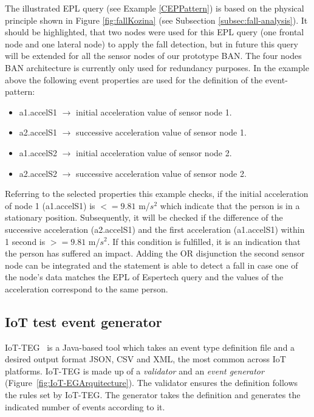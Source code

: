 \documentclass[10pt,journal,compsoc]{IEEEtran}
\begin{document}
The illustrated EPL query (see Example \ref{CEPPattern}) is based on the physical principle shown in Figure \ref{fig:fallKozina} (see Subsection \ref{subsec:fall-analysis}). It should be highlighted, that two nodes were used for this EPL query (one frontal node and one lateral node) to apply the fall detection, but in future this query will be extended for all the sensor nodes of our prototype BAN. The four nodes BAN architecture is currently only used for redundancy purposes. In the example above the following event properties are used for the definition of the event-pattern:
\begin{itemize}
	\item a1.accelS1 $\rightarrow$ initial acceleration value of sensor node 1.
	\item a2.accelS1 $\rightarrow$ successive acceleration value of sensor node 1.
	\item a1.accelS2 $\rightarrow$ initial acceleration value of sensor node 2.
	\item a2.accelS2 $\rightarrow$ successive acceleration value of sensor node 2.
\end{itemize}
Referring to the selected properties this example checks, if the initial acceleration of node 1 (a1.accelS1) is $<= 9.81$ m/$s^2$ which indicate that the person is in a stationary position. Subsequently, it will be checked if the difference of the successive acceleration (a2.accelS1) and the first acceleration (a1.accelS1) within 1 second is $>= 9.81$ m/$s^2$. If this condition is fulfilled, it is an indication that the person has suffered an impact. Adding the OR disjunction the second sensor node can be integrated and the statement is able to detect a fall in case one of the node's data matches the EPL of Espertech query and the values of the acceleration correspond to the same person.

\subsection{IoT test event generator}
\label{iotteg}

IoT-TEG~\cite{Gutierrez2017,TesisGutierrez2017} is a Java-based tool which takes an event 
type definition file and a desired output format JSON, CSV and XML, the most common across IoT platforms. IoT-TEG is made up of a \emph{validator} and an \emph{event generator} 
(Figure~\ref{fig:IoT-EGArquitecture}). The validator ensures the definition follows the rules set 
by IoT-TEG. The generator takes the definition and generates the indicated number of events according to it.
\end{document}
